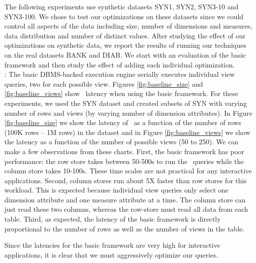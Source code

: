 The following experiments use synthetic datasets SYN1, SYN2, SYN3-10 and
SYN3-100. 
We chose to test our optimizations on these datasets since we could
control all aspects of the data including size, number of
dimensions and measures, data distribution and number of distinct values.
After studying the effect of our optimizations on synthetic data, we report the
results of running our techniques on the real datasets BANK and DIAB.
We start with an evaluation of the basic framework and
then study the effect of adding each individual optimization. \\

: The basic DBMS-backed execution engine
serially executes individual view queries, two for each possible view.
Figures \ref{fig:baseline_size} and \ref{fig:baseline_views} show
\VizRecDB\ latency when using the basic framework.
For these experiments, we used the SYN dataset and created subsets of SYN  with
varying number of rows and views (by varying number of dimension attributes). 
In
Figure \ref{fig:baseline_size} we show the latency of \VizRecDB\ as a function
of the number of rows (100K rows -- 1M rows) in the dataset and in 
Figure \ref{fig:baseline_views} 
we show the latency as a function of the number of possible views
(50 to 250).
We can make a few observations from these charts. First, the basic framework has
 poor performance: the row store takes between 50-500s to run the \VizRecDB\ queries
while the column store takes 10-100s. These time scales are not practical for
any interactive applications. Second, column stores run about 5X faster than row
stores for this workload. 
This is expected because individual view queries only select one dimension
attribute and one measure attribute at a time.  The column store can just read these two
columns, whereas the row-store must read all data from each table.
Third, as expected, the latency of the
basic framework is directly proportional to the number of rows as well as the 
number of views in the table.

Since the latencies for the basic framework are very high for interactive
applications, it is clear that we must aggressively optimize our queries. \\


